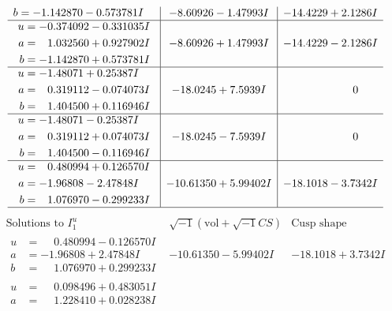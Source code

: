 \documentclass[1p]{elsarticle_modified}
\theoremstyle{definition}
\newcommand{\I}{\sqrt{-1}}
\begin{document}
$$\begin{array}{c|c|c}
\begin{aligned}
b &= -1.142870 - 0.573781 I\end{aligned}
 & -8.60926 - 1.47993 I & -14.4229 + 2.1286 I \\ \hline\begin{aligned}
u &= -0.374092 - 0.331035 I \\
a &= \phantom{-}1.032560 + 0.927902 I \\
b &= -1.142870 + 0.573781 I\end{aligned}
 & -8.60926 + 1.47993 I & -14.4229 - 2.1286 I \\ \hline\begin{aligned}
u &= -1.48071 + 0.25387 I \\
a &= \phantom{-}0.319112 - 0.074073 I \\
b &= \phantom{-}1.404500 + 0.116946 I\end{aligned}
 & -18.0245 + 7.5939 I & \phantom{-0.000000 } 0 \\ \hline\begin{aligned}
u &= -1.48071 - 0.25387 I \\
a &= \phantom{-}0.319112 + 0.074073 I \\
b &= \phantom{-}1.404500 - 0.116946 I\end{aligned}
 & -18.0245 - 7.5939 I & \phantom{-0.000000 } 0 \\ \hline\begin{aligned}
u &= \phantom{-}0.480994 + 0.126570 I \\
a &= -1.96808 - 2.47848 I \\
b &= \phantom{-}1.076970 - 0.299233 I\end{aligned}
 & -10.61350 + 5.99402 I & -18.1018 - 3.7342 I\\
 \hline 
 \end{array}$$\newpage$$\begin{array}{c|c|c}  
\text{Solutions to }I^u_{1}& \I (\text{vol} + \sqrt{-1}CS) & \text{Cusp shape}\\
 \hline 
\begin{aligned}
u &= \phantom{-}0.480994 - 0.126570 I \\
a &= -1.96808 + 2.47848 I \\
b &= \phantom{-}1.076970 + 0.299233 I\end{aligned}
 & -10.61350 - 5.99402 I & -18.1018 + 3.7342 I \\ \hline\begin{aligned}
u &= \phantom{-}0.098496 + 0.483051 I \\
a &= \phantom{-}1.228410 + 0.028238 I \\

\end{aligned}
\end{array}$$
\end{document}
